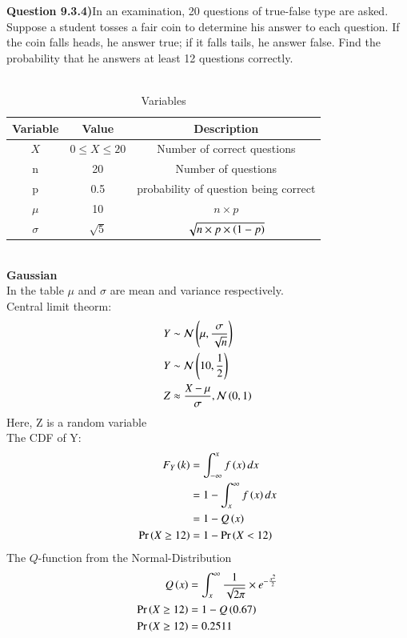 \documentclass[journal,12pt,twocolumn]{IEEEtran}
\theoremstyle{remark}
\begin{document}
\textbf{Question 9.3.4)}In an examination, 20 questions of true-false type are asked. Suppose a student tosses
a fair coin to determine his answer to each question. If the coin falls heads, he answer
true; if it falls tails, he answer false. Find the probability that he answers at least 12
questions correctly.\\
\solution \\
\begin{table}[ht]
    \centering
    \caption{Variables}
    \label{table:random-variables-9.3.4}
\begin{tabular}{|c|c|c|}
\hline
Variable & Value & Description \\
\hline
$X$ & $0 \le X \le 20$ & Number of correct questions \\
\hline
n & 20 & Number of questions\\
\hline
p & 0.5 & probability of question being correct\\
\hline
$\mu$ & 10 & $n\times p$\\
\hline
$\sigma$ & $\sqrt{5}$ & $\sqrt{n\times p\times \left(1-p\right)}$\\
\hline
\end{tabular} 
\end{table}\\
\textbf{Gaussian}\\
In the table $\mu$ and $\sigma$ are mean and variance respectively.\\
Central limit theorm:
\begin{align}
Y &\sim \mathcal{N}\left(\mu,\frac{\sigma}{\sqrt{n}}\right)\\
Y &\sim \mathcal{N}\left(10,\frac{1}{2}\right)\\
Z &\approx \frac{X-\mu}{\sigma},\mathcal{N}\left(0,1\right)
\end{align}
Here, Z is a random variable \\
The CDF of Y:
\begin{align}
F_Y\left(k\right)&=\int_{-\infty}^{x}f\left(x\right)dx\\
&=1-\int_{x}^{\infty}f\left(x\right)dx\\
&=1-Q\left(x\right)\\
\Pr\left(X \ge 12\right)&=1-\Pr\left(X < 12\right)
\end{align}
The $Q$-function from the Normal-Distribution
\begin{align}
Q\left(x\right) &= \int_{x}^{\infty} \frac{1}{\sqrt{2\pi}} \times e^{-\frac{x^2}{2}} \\
\Pr\left(X \ge 12\right) &= 1-Q\left(0.67\right)\\
\Pr\left(X \ge 12\right) &= 0.2511
\end{align}
\end{document}
